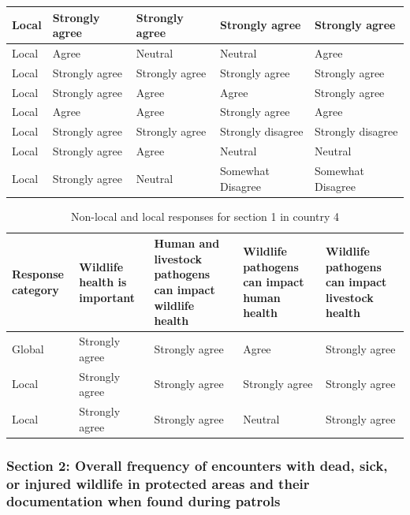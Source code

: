 \documentclass[
  letterpaper,
  DIV=11,
  numbers=noendperiod]{scrartcl}
\begin{document}
\begin{table}[H]
\begin{tabular}[t]{>{\raggedright\arraybackslash}p{2cm}|>{\raggedright\arraybackslash}p{3cm}|>{\raggedright\arraybackslash}p{3cm}|>{\raggedright\arraybackslash}p{3cm}|>{\raggedright\arraybackslash}p{3cm}}
\hline
Local & Strongly agree & Strongly agree & Strongly agree & Strongly \vphantom{1} agree\\
\hline
Local & Agree & Neutral & Neutral & Agree\\
\hline
Local & Strongly agree & Strongly agree & Strongly agree & Strongly agree\\
\hline
Local & Strongly agree & Agree & Agree & Strongly agree\\
\hline
Local & Agree & Agree & Strongly agree & Agree\\
\hline
Local & Strongly agree & Strongly agree & Strongly disagree & Strongly disagree\\
\hline
Local & Strongly agree & Agree & Neutral & Neutral\\
\hline
Local & Strongly agree & Neutral & Somewhat Disagree & Somewhat Disagree\\
\hline
\end{tabular}
\end{table}

\begin{table}[H]

\caption{Non-local and local responses for section 1 in country 4}
\centering
\begin{tabular}[t]{>{\raggedright\arraybackslash}p{2cm}|>{\raggedright\arraybackslash}p{3cm}|>{\raggedright\arraybackslash}p{3cm}|>{\raggedright\arraybackslash}p{3cm}|>{\raggedright\arraybackslash}p{3cm}}
\hline
Response
category & Wildlife health
is important & Human and livestock
pathogens can
impact wildlife
health & Wildlife pathogens can
impact human health & Wildlife pathogens can
impact livestock health\\
\hline
Global & Strongly agree & Strongly agree & Agree & Strongly agree\\
\hline
Local & Strongly agree & Strongly agree & Strongly agree & Strongly agree\\
\hline
Local & Strongly agree & Strongly agree & Neutral & Strongly agree\\
\hline
\end{tabular}
\end{table}

\hypertarget{section-2-overall-frequency-of-encounters-with-dead-sick-or-injured-wildlife-in-protected-areas-and-their-documentation-when-found-during-patrols-1}{%
\subsubsection{Section 2: Overall frequency of encounters with dead,
sick, or injured wildlife in protected areas and their documentation
when found during
patrols}\label{section-2-overall-frequency-of-encounters-with-dead-sick-or-injured-wildlife-in-protected-areas-and-their-documentation-when-found-during-patrols-1}}
\end{document}
